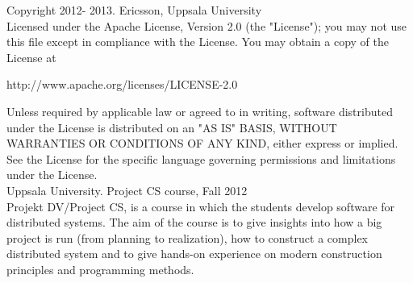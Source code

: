 Copyright 2012- 2013. Ericsson, Uppsala University\\

Licensed under the Apache License, Version 2.0 (the "License");
you may not use this file except in compliance with the License.
You may obtain a copy of the License at\\

    \begin{center}http://www.apache.org/licenses/LICENSE-2.0\end{center}

Unless required by applicable law or agreed to in writing, software
distributed under the License is distributed on an "AS IS" BASIS,
WITHOUT WARRANTIES OR CONDITIONS OF ANY KIND, either express or implied.
See the License for the specific language governing permissions and
limitations under the License.\\

Uppsala University. Project CS course, Fall 2012\\
 
Projekt DV/Project CS, is a course in which the students develop software for
distributed systems. The aim of the course is to give insights into how a big
project is run (from planning to realization), how to construct a complex
distributed system and to give hands-on experience on modern construction
principles and programming methods.
